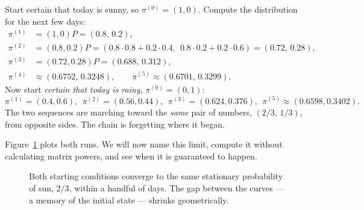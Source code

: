 \begin{walkbox}
Start certain that today is sunny, so $\pi^{(0)} = (1,0)$. Compute the
distribution for the next few days:
\[
  \begin{aligned}
    \pi^{(1)} &= (1,0)P = (0.8,\,0.2),\\
    \pi^{(2)} &= (0.8,0.2)P = (0.8\cdot0.8 + 0.2\cdot0.4,\ \ 0.8\cdot0.2 + 0.2\cdot0.6) = (0.72,\,0.28),\\
    \pi^{(3)} &= (0.72,0.28)P = (0.688,\,0.312),\\
    \pi^{(4)} &\approx (0.6752,\,0.3248),\qquad
    \pi^{(5)} \approx (0.6701,\,0.3299).
  \end{aligned}
\]
Now start \emph{certain that today is rainy}, $\pi^{(0)}=(0,1)$:
\[
  \pi^{(1)} = (0.4,0.6),\ \ \pi^{(2)}=(0.56,0.44),\ \ \pi^{(3)}=(0.624,0.376),\ \ \pi^{(5)}\approx(0.6598,0.3402).
\]
The two sequences are marching toward the \emph{same} pair of numbers,
$(2/3,\,1/3)$, from opposite sides. The chain is forgetting where it began.
\end{walkbox}

Figure~\ref{ch24:fig-weather-converge} plots both runs. We will now name this limit, compute it without calculating matrix powers, and see when it is guaranteed to happen.

\begin{figure}[H]
  \centering
  \caption{Both starting conditions converge to the same stationary
  probability of sun, $2/3$, within a handful of days. The gap between the curves
  --- a memory of the initial state --- shrinks geometrically.}
  \label{ch24:fig-weather-converge}
\end{figure}
